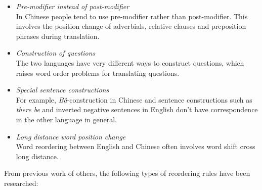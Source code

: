 \documentclass[a4paper]{article}
\begin{document}
\begin{itemize}
\item \emph{Pre-modifier instead of post-modifier}\\ In Chinese people tend to use pre-modifier rather than post-modifier. This involves the position change of adverbials, relative clauses and preposition phrases during translation.
\item \emph{Construction of questions}\\
The two languages have very different ways to construct questions, which raises word order problems for translating questions.
\item \emph{Special sentence constructions}\\ For example, \emph{B\^{a}}-construction in Chinese and sentence constructions such as \emph{there be} and inverted negative sentences in English don't have correspondence in the other language in general.
\item \emph{Long distance word position change}\\
Word reordering between English and Chinese often involves word shift cross long distance.
\end{itemize}

From previous work of others, the following types of reordering rules have been researched:
\end{document}
